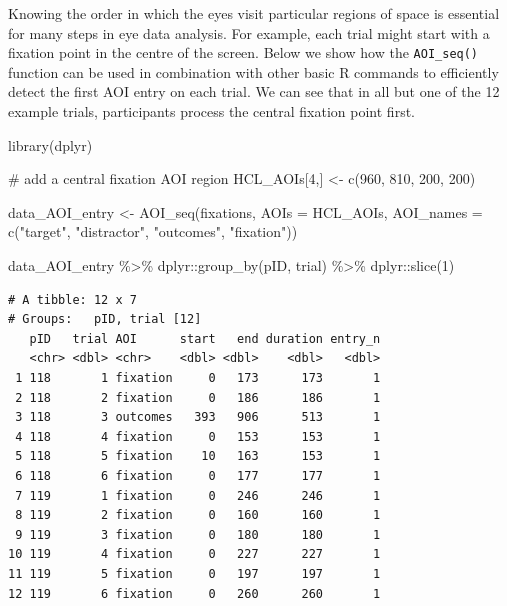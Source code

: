 \documentclass[
  man,
  floatsintext,
  longtable,
  nolmodern,
  notxfonts,
  notimes,
  colorlinks=true,linkcolor=blue,citecolor=blue,urlcolor=blue]{apa7}
\newenvironment{Shaded}{\begin{snugshade}}{\end{snugshade}}
\newcommand{\AttributeTok}[1]{\textcolor[rgb]{0.40,0.45,0.13}{#1}}
\newcommand{\CommentTok}[1]{\textcolor[rgb]{0.37,0.37,0.37}{#1}}
\newcommand{\DecValTok}[1]{\textcolor[rgb]{0.68,0.00,0.00}{#1}}
\newcommand{\FunctionTok}[1]{\textcolor[rgb]{0.28,0.35,0.67}{#1}}
\newcommand{\NormalTok}[1]{\textcolor[rgb]{0.00,0.23,0.31}{#1}}
\newcommand{\OtherTok}[1]{\textcolor[rgb]{0.00,0.23,0.31}{#1}}
\newcommand{\SpecialCharTok}[1]{\textcolor[rgb]{0.37,0.37,0.37}{#1}}
\newcommand{\StringTok}[1]{\textcolor[rgb]{0.13,0.47,0.30}{#1}}
\begin{document}
Knowing the order in which the eyes visit particular regions of space is
essential for many steps in eye data analysis. For example, each trial
might start with a fixation point in the centre of the screen. Below we
show how the \texttt{AOI\_seq()} function can be used in combination
with other basic R commands to efficiently detect the first AOI entry on
each trial. We can see that in all but one of the 12 example trials,
participants process the central fixation point first.

\begin{Shaded}
\begin{Highlighting}[]
\FunctionTok{library}\NormalTok{(dplyr)}

\CommentTok{\# add a central fixation AOI region}
\NormalTok{HCL\_AOIs[}\DecValTok{4}\NormalTok{,] }\OtherTok{\textless{}{-}} \FunctionTok{c}\NormalTok{(}\DecValTok{960}\NormalTok{, }\DecValTok{810}\NormalTok{, }\DecValTok{200}\NormalTok{, }\DecValTok{200}\NormalTok{)}

\NormalTok{data\_AOI\_entry }\OtherTok{\textless{}{-}} 
  \FunctionTok{AOI\_seq}\NormalTok{(fixations, }
          \AttributeTok{AOIs =}\NormalTok{ HCL\_AOIs,}
          \AttributeTok{AOI\_names =} \FunctionTok{c}\NormalTok{(}\StringTok{"target"}\NormalTok{, }\StringTok{"distractor"}\NormalTok{, }\StringTok{"outcomes"}\NormalTok{, }\StringTok{"fixation"}\NormalTok{))}

\NormalTok{data\_AOI\_entry }\SpecialCharTok{\%\textgreater{}\%} 
\NormalTok{  dplyr}\SpecialCharTok{::}\FunctionTok{group\_by}\NormalTok{(pID, trial) }\SpecialCharTok{\%\textgreater{}\%} 
\NormalTok{  dplyr}\SpecialCharTok{::}\FunctionTok{slice}\NormalTok{(}\DecValTok{1}\NormalTok{)}
\end{Highlighting}
\end{Shaded}

\begin{verbatim}
# A tibble: 12 x 7
# Groups:   pID, trial [12]
   pID   trial AOI      start   end duration entry_n
   <chr> <dbl> <chr>    <dbl> <dbl>    <dbl>   <dbl>
 1 118       1 fixation     0   173      173       1
 2 118       2 fixation     0   186      186       1
 3 118       3 outcomes   393   906      513       1
 4 118       4 fixation     0   153      153       1
 5 118       5 fixation    10   163      153       1
 6 118       6 fixation     0   177      177       1
 7 119       1 fixation     0   246      246       1
 8 119       2 fixation     0   160      160       1
 9 119       3 fixation     0   180      180       1
10 119       4 fixation     0   227      227       1
11 119       5 fixation     0   197      197       1
12 119       6 fixation     0   260      260       1
\end{verbatim}
\end{document}
